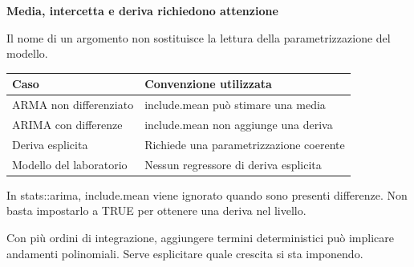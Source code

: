 \documentclass[12pt,aspectratio=1610]{beamer}
\newcommand{\PBody}[1]{\par{\fontsize{11.3}{14.8}\selectfont #1\par}}
\newcommand{\PSmall}[1]{\par{\fontsize{9.8}{13.1}\selectfont #1\par}}
\newcommand{\PInfo}[1]{%
\begin{tcolorbox}[enhanced,arc=1.6mm,boxrule=.55pt,colback=GeoTint,
 colframe=Rule!80!Classical,left=2.3mm,right=2.3mm,top=2mm,bottom=2mm,
 before skip=1mm,after skip=1mm]
\PSmall{#1}\end{tcolorbox}}
\begin{document}
\begin{frame}[plain]\hypertarget{slide51}{}
\begin{lrbox}{\TitleBox}
\begin{minipage}[t]{17.7cm}\raggedright\color{Ink}\fontsize{11.3}{14.8}\selectfont
\color{Navy}\bfseries\fontsize{20.6}{24.5}\selectfont Media, intercetta e deriva richiedono attenzione
\end{minipage}\end{lrbox}

\begin{lrbox}{\RecallBox}
\begin{minipage}[t]{14.3cm}\raggedright\color{Ink}\fontsize{11.3}{14.8}\selectfont
\fontsize{10.3}{13.8}\selectfont Il nome di un argomento non sostituisce la lettura della parametrizzazione del modello.
\end{minipage}\end{lrbox}

\begin{lrbox}{\PilotLeftBox}
\begin{minipage}[t]{10.05cm}\raggedright\color{Ink}\fontsize{11.3}{14.8}\selectfont
{\fontsize{10.2}{13.1}\selectfont\renewcommand{\arraystretch}{1.45}\begin{tabular}{@{}p{4.2cm}p{4.9cm}@{}}\toprule
\textbf{Caso} & \textbf{Convenzione utilizzata}\\\midrule
ARMA non differenziato & include.mean può stimare una media\\
ARIMA con differenze & include.mean non aggiunge una deriva\\
Deriva esplicita & Richiede una parametrizzazione coerente\\
Modello del laboratorio & Nessun regressore di deriva esplicita\\
\bottomrule\end{tabular}}

\end{minipage}\end{lrbox}

\begin{lrbox}{\PilotRightBox}
\begin{minipage}[t]{7.55cm}\raggedright\color{Ink}\fontsize{11.3}{14.8}\selectfont
\PBody{In stats::arima, include.mean viene ignorato quando sono presenti differenze. Non basta impostarlo a TRUE per ottenere una deriva nel livello.}
\vspace{2.5mm}
\PInfo{Con più ordini di integrazione, aggiungere termini deterministici può implicare andamenti polinomiali. Serve esplicitare quale crescita si sta imponendo.}


\end{minipage}
\end{lrbox}
\end{frame}
\end{document}
